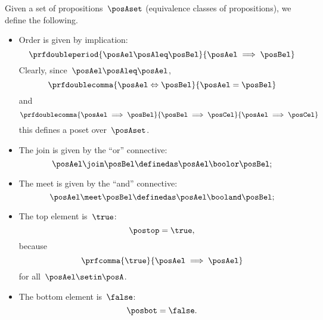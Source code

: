 \begin{ctdefinition}
    \label{def:prop-as-lattice}
    Given a set of propositions~$\posAset$ (equivalence classes of propositions), we define the following.
    \begin{itemize}
        \item Order is given by implication:
              \begin{equation}
                  \prfdoubleperiod{
                      \posAel\posAleq \posBel
                  }{
                      \posAel \implies \posBel
                  }
              \end{equation}
              Clearly, since~$\posAel \posAleq \posAel$,
              \begin{equation}
                  \prfdoublecomma{
                      \posAel \Leftrightarrow \posBel
                  }{
                      \posAel =\posBel
                  }
              \end{equation}
              and
              \begin{equation}
                  \prfdoublecomma{
                      \posAel \implies \posBel
                  }{
                      \posBel \implies \posCel
                  }{
                      \posAel \implies \posCel
                  }
              \end{equation}
              this defines a poset over~$\posAset$.
        \item The join is given by the ``or'' connective:
              \begin{equation}
                  \posAel \join \posBel \definedas \posAel \boolor \posBel;
              \end{equation}
        \item The meet is given by the ``and'' connective:
              \begin{equation}
                  \posAel \meet \posBel \definedas \posAel \booland \posBel;
              \end{equation}
        \item The top element is~$\true$:
              \begin{equation}
                  \postop = \true,
              \end{equation}
              because
              \begin{equation}
                  \prfcomma{
                      \true
                  }{
                      \posAel \implies \posAel
                  }
              \end{equation}
              for all~$\posAel\setin \posA$.
        \item The bottom element is~$\false$:
              \begin{equation}
                  \posbot = \false.
              \end{equation}
    \end{itemize}
\end{ctdefinition}
\begin{marginfigure}
    \centering
    \caption{}
    \label{fig:prod_coprod_prop}
\end{marginfigure}

